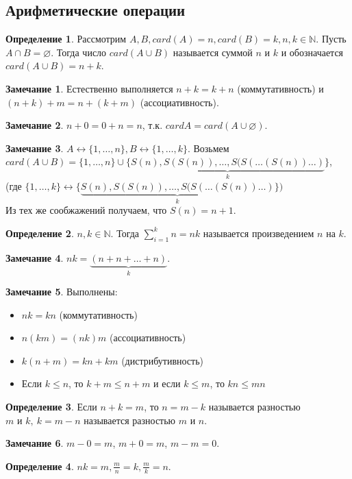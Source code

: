 \documentclass[a4paper, 12pt]{article}
\newcommand{\N}{\mathbb{N}}
\renewcommand{\emptyset}{\varnothing}
\theoremstyle{definition}
\newtheorem*{definition}{Определение}
\newtheorem*{comm}{Замечание}
\begin{document}
    \subsection{Арифметические операции}
        \begin{definition}
            Рассмотрим $A,B, card(A)=n, card(B)=k, n,k\in \N$. Пусть $A\cap B=\emptyset$. Тогда число $card(A\cup B)$ называется суммой $n$ и $k$ и обозначается $card(A\cup B)=n+k$.
        \end{definition}
        \begin{comm}
            Естественно выполняется $n+k=k+n$ (коммутативность) и\\ $(n+k)+m=n+(k+m)$ (ассоциативность).
        \end{comm}
        \begin{comm}
            $n+0=0+n=n$, т.к. $cardA=card(A\cup \emptyset)$.
        \end{comm}
        \begin{comm}
            $A \leftrightarrow \{1,\dots, n\}, B\leftrightarrow \{1,\dots, k\}$. Возьмем\\ $card(A\cup B)=\{1,\dots, n\}\cup \{\underbrace{S(n), S(S(n)), \dots, S(S(\dots (S(n))\dots)}_k\}$,\\ (где $\{1,\dots, k\} \leftrightarrow \{\underbrace{S(n), S(S(n)), \dots, S(S(\dots (S(n))\dots)}_k\})$\\
            Из тех же сообжажений получаем, что $S(n)=n+1$.
        \end{comm} 
        \begin{definition}
            $n,k\in \N$. Тогда $\sum\limits_{i=1}^kn=nk$ называется произведением $n$ на $k$.
        \end{definition}
        \begin{comm}
            $nk=\underbrace{(n+n+\dots +n)}_k$. 
        \end{comm}
        \begin{comm} Выполнены:
            \begin{itemize}
                \item $nk=kn$ (коммутативность)
                \item $n(km)=(nk)m$ (ассоциативность)
                \item $k(n+m)=kn+km$ (дистрибутивность)
                \item Если $k\leq n$, то $k+m\leq n+m$ и если $k\leq m$, то $kn\leq mn$
            \end{itemize}
        \end{comm}
        \begin{definition}
            Если $n+k=m$, то $n=m-k$ называется разностью\\ $m$ и $k,\ k=m-n$ называется разностью $m$ и $n$.
        \end{definition}
        \begin{comm}
            $m-0=m$, $m+0=m$, $m-m=0$.
        \end{comm}
        \begin{definition}
            $nk=m, \frac{m}{n}=k, \frac{m}{k}=n$.
        \end{definition}
\end{document}
